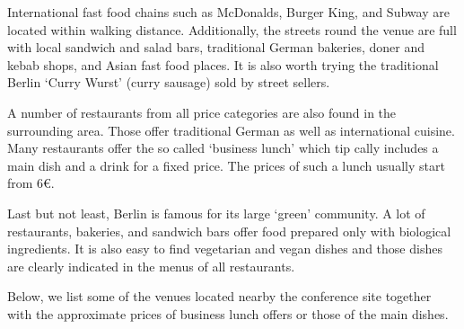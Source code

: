 International fast food chains such as McDonalds, Burger King, and Subway are located within walking distance. Additionally, the streets round the venue are full with local sandwich and salad bars, traditional German bakeries, doner and kebab shops, and Asian fast food places. It is also worth trying the traditional Berlin `Curry Wurst' (curry sausage) sold by street sellers. 

A number of restaurants from all price categories are also found in the surrounding area. Those offer traditional German  as well as international cuisine. Many restaurants offer the so called `business lunch' which tip cally includes a main dish and a drink for a fixed price. The prices of such a lunch usually start from 6€.

Last but not least, Berlin is famous for its large `green' community. A lot of restaurants, bakeries, and sandwich  bars offer food prepared only with biological ingredients. It is also easy to find vegetarian and vegan dishes and those dishes are clearly indicated in the menus of all restaurants.

Below, we list some of the venues located nearby the conference site together with the approximate prices of business lunch offers or those  of the main dishes.

